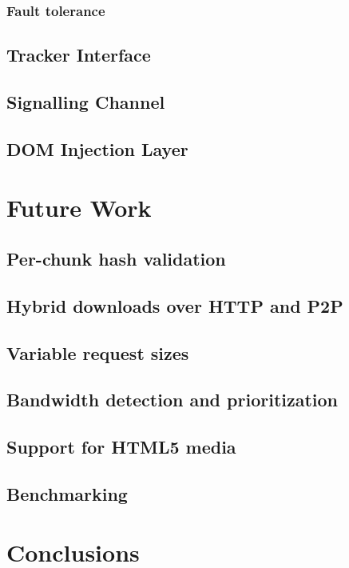 \documentclass[letterpaper,twocolumn,10pt]{article}
\begin{document}
\subsubsection{Fault tolerance}


\subsection{Tracker Interface}

\subsection{Signalling Channel}

\subsection{DOM Injection Layer}


\section{Future Work}
\subsection*{Per-chunk hash validation}


\subsection*{Hybrid downloads over HTTP and P2P}


\subsection*{Variable request sizes}


\subsection*{Bandwidth detection and prioritization}


\subsection*{Support for HTML5 media}


\subsection*{Benchmarking}


\section{Conclusions}


{\footnotesize 
}
\end{document}
